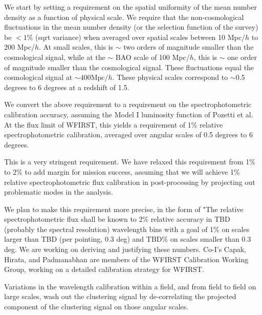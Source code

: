  We start by setting a requirement on the spatial uniformity of the mean number
 density as a function of physical scale. We require that the non-cosmological
 fluctuations in the mean number density (or the selection function of the
 survey) be $< 1\%$ (sqrt variance) when averaged over spatial scales between 10
 Mpc/$h$ to 200 Mpc/$h$. At small scales, this is $\sim$ two orders of magnitude smaller
 than the cosmological signal, while at the $\sim$ BAO scale of 100 Mpc/$h$, this
 is $\sim$ one
 order of magnitude smaller than the cosmological signal.  These fluctuations
 equal the cosmological signal at $\sim400 \mathrm{Mpc}/h$.  These physical scales correspond
 to $\sim0.5$ degrees to 6 degrees at a redshift of 1.5.

 We convert the above requirement to a requirement on the spectrophotometric
 calibration accuracy, assuming the Model I luminosity function of Pozetti et al.
 At the flux limit of WFIRST, this yields a requirement of 1\% relative
 spectrophotometric calibration, averaged over angular scales of 0.5 degrees to 6
 degrees.

 This is a very stringent requirement. We have relaxed this requirement from 1\%
 to 2\% to add margin for mission success, assuming that we will achieve 1\%
 relative spectrophotometric flux calibration in post-processing by projecting
 out problematic modes in the analysis.

 We plan to make this requirement more precise, in the form of "The relative
 spectrophotometric flux shall be known to 2\% relative accuracy in TBD (probably
 the spectral resolution) wavelength bins with a goal of 1\% on scales larger
 than TBD (per pointing, 0.3 deg) and TBD\% on scales smaller than 0.3 deg.
 We are working on deriving and justifying these numbers.
 Co-I's Capak, Hirata, and Padmanabhan are members of the WFIRST Calibration Working Group, working on a detailed calibration strategy for WFIRST.



 Variations in the wavelength calibration within a field, and from field to field
 on large scales, wash out the clustering signal by de-correlating the projected
 component of the clustering signal on those angular scales.

